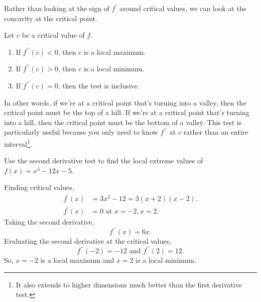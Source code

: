 \noindent
Rather than looking at the sign of $f^\prime$ around critical values, we can look at the concavity at the critical point.
\begin{theorem}
	Let $c$ be a critical value of $f$.
	\begin{enumerate}
		\item If $f^{\prime\prime}(c) < 0$, then $c$ is a local maximum.
		\item If $f^{\prime\prime}(c) > 0$, then $c$ is a local minimum.
		\item If $f^{\prime\prime}(c) = 0$, then the test is inclusive.
	\end{enumerate}
\end{theorem}
\noindent
In other words, if we're at a critical point that's turning into a valley, then the critical point must be the top of a hill.
If we're at a critical point that's turning into a hill, then the critical point must be the bottom of a valley.
This test is particularly useful because you only need to know $f^{\prime\prime}$ at $c$ rather than an entire interval\footnote{It also extends to higher dimensions much better than the first derivative test.}.

\begin{example}
	Use the second derivative test to find the local extreme values of $f(x) = x^3 - 12x - 5$.
\end{example}
Finding critical values,
\begin{align*}
	f^\prime(x) &= 3x^2 - 12 = 3(x+2)(x-2). \\
	f^\prime(x) &= 0\text{ at } x=-2, x=2.
\end{align*}
\indent
Taking the second derivative,
\begin{equation*}
	f^{\prime\prime}(x) = 6x.
\end{equation*}
\indent
Evaluating the second derivative at the critical values,
\begin{equation*}
	f^{\prime\prime}(-2) = -12 \text{ and } f^{\prime\prime}(2) = 12.
\end{equation*}
\indent
So, $x=-2$ is a local maximum and $x=2$ is a local minimum.